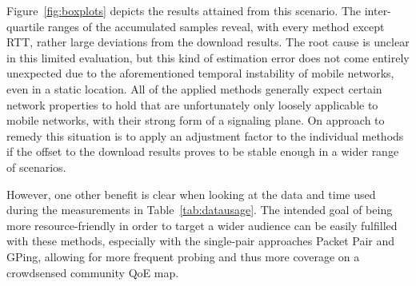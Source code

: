Figure~\ref{fig:boxplots} depicts the results attained from this scenario. The inter-quartile ranges of the accumulated samples reveal, with every method except RTT, rather large deviations from the download results. The root cause is unclear in this limited evaluation, but this kind of estimation error does not come entirely unexpected due to the aforementioned temporal instability of mobile networks, even in a static location. All of the applied methods generally expect certain network properties to hold that are unfortunately only loosely applicable to mobile networks, with their strong form of a signaling plane. On approach to remedy this situation is to apply an adjustment factor to the individual methods if the offset to the download results proves to be stable enough in a wider range of scenarios.

However, one other benefit is clear when looking at the data and time used during the measurements in Table~\ref{tab:datausage}. The intended goal of being more resource-friendly in order to target a wider audience can be easily fulfilled with these methods, especially with the single-pair approaches Packet Pair and GPing, allowing for more frequent probing and thus more coverage on a crowdsensed community \gls{QoE} map.





















